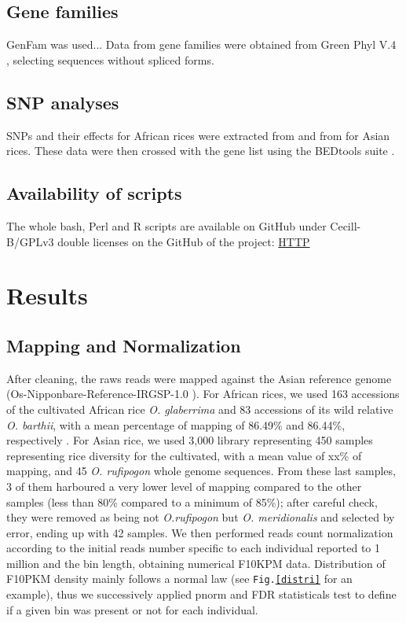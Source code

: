\documentclass[10pt,letterpaper]{article}
\begin{document}
\subsection*{Gene families}
GenFam was used...
Data from gene families were obtained from Green Phyl V.4 \cite{Conte2008b, Conte2008a, Rouard2011}, selecting sequences without spliced forms.

\subsection{SNP analyses}
SNPs and their effects for African rices were extracted from \cite{Cubry2017} and from \cite{3kRGP} for Asian rices. These data were then crossed with the gene list using the BEDtools suite \cite{REF}.

\subsection*{Availability of scripts}
The whole bash, Perl and R scripts are available on GitHub under Cecill-B/GPLv3 double licenses on the GitHub of the project: \url{HTTP}

\section*{Results}
\subsection*{Mapping and Normalization}
After cleaning, the raws reads were mapped against the Asian reference genome (Os-Nipponbare-Reference-IRGSP-1.0 \cite{Mcnally2009, Kawahara2013}). For African rices, we used 163 accessions of the cultivated African rice \textit{O. glaberrima} and 83 accessions of its wild relative \textit{O. barthii}, with a mean percentage of mapping of 86.49\% and 86.44\%, respectively \cite{Cubry2018}. For Asian rice, we used 3,000 library representing 450 samples representing rice diversity for the cultivated, with a mean value of xx\% of mapping, and 45 \textit{O. rufipogon} whole genome sequences. From these last samples, 3 of them harboured a very lower level of mapping compared to the other samples (less than 80\% compared to a minimum of 85\%); after careful check, they were removed as being not \textit{O.rufipogon} but \textit{O. meridionalis} and selected by error, ending up with 42 samples. We then performed reads count normalization according to the initial reads number specific to each individual reported to 1 million and the bin length, obtaining numerical F10KPM data. Distribution of F10PKM density mainly follows a normal law (see \texttt{Fig.\ref{distri}} for an example), thus we successively applied pnorm and FDR statisticals test to define if a given bin was present or not for each individual.
\end{document}

